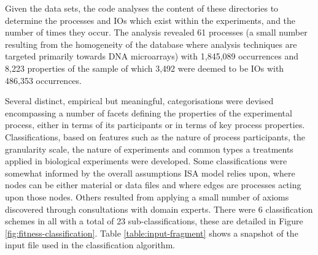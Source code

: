 Given the data sets, the code analyses the content of these directories to determine the processes and IOs which exist within the experiments, and the number of times they occur. The analysis revealed 61 processes (a small number resulting from the homogeneity of the database where analysis techniques are targeted primarily towards DNA microarrays) with 1,845,089 occurrences and 8,223 properties of the sample of which 3,492 were deemed to be IOs with 486,353 occurrences.

Several distinct, empirical but meaningful, categorisations were devised encompassing a number of facets defining the properties of the experimental process, either in terms of its participants or in terms of key process properties. Classifications, based on features such as the nature of process participants, the granularity scale, the nature of experiments and common types a treatments applied in biological experiments were developed. Some classifications were somewhat informed by the overall assumptions ISA model relies upon, where nodes can be either material or data files and where edges are processes acting upon those nodes. Others resulted from applying a small number of axioms discovered through consultations with domain experts. There were 6 classification schemes in all with a total of 23 sub-classifications, these are detailed in Figure \ref{fig:fitness-classification}.
Table \ref{table:input-fragment} shows a snapshot of the input file used in the classification algorithm.

